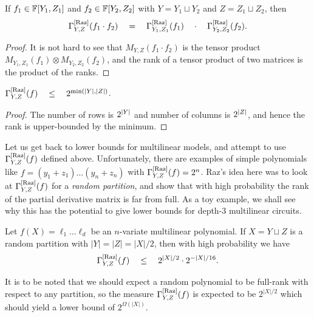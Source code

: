\begin{observation}[Multiplicativity]\label{obs:pdm-multiplicativity}
If $f_1 \in \mathbb{F}[Y_1,Z_1]$ and $f_2 \in \mathbb{F}[Y_2, Z_2]$ with $Y = Y_1 \sqcup Y_2$ and $Z = Z_1 \sqcup Z_2$, then
$$
\Gamma^{\mathrm{[Raz]}}_{Y,Z}(f_1\cdot f_2) \quad = \quad \Gamma^{\mathrm{[Raz]}}_{Y_1, Z_1}(f_1) \quad \cdot \quad \Gamma^{\mathrm{[Raz]}}_{Y_2, Z_2}(f_2).
$$
\end{observation}
\begin{proof}
  It is not hard to see that $M_{Y,Z}(f_1\cdot f_2)$ is the tensor product $M_{Y_1, Z_1}(f_1) \otimes M_{Y_2, Z_2}(f_2)$, and the rank of a tensor product of two matrices is the product of the ranks.
\end{proof}

\begin{observation}\label{obs:pdm-upperbound}
  $\Gamma^{\mathrm{[Raz]}}_{Y,Z}(f) \quad \leq \quad 2^{\min(\left|Y\right|, \left|Z\right|)}$.
\end{observation}
\begin{proof}
  The number of rows is $2^{\left|Y\right|}$ and number of columns is $2^{\left|Z\right|}$, and hence the rank is upper-bounded by the minimum.
\end{proof}


Let us get back to lower bounds for multilinear models, and attempt to use $\Gamma^{\mathrm{[Raz]}}_{Y,Z}(f)$ defined above. Unfortunately, there are examples of simple polynomials like $f = (y_1 + z_1)\dots (y_n + z_n)$ with $\Gamma^{\mathrm{[Raz]}}_{Y,Z}(f) = 2^n$. Raz's idea here was to look at $\Gamma^{\mathrm{[Raz]}}_{Y,Z}(f)$ for a \emph{random partition}, and show that with high probability the rank of the partial derivative matrix is far from full. As a toy example, we shall see why this has the potential to give lower bounds for depth-$3$ multilinear circuits. 

\begin{lemma}
Let $f(X) = \ell_1 \dots \ell_d$ be an $n$-variate multilinear polynomial. If $X = Y\sqcup Z$ is a random partition with $|Y| = |Z| = |X|/2$, then with high probability we have
$$
\Gamma^{\mathrm{[Raz]}}_{Y,Z}(f) \quad \leq \quad 2^{|X|/2} \cdot 2^{-|X|/16}.
$$
\end{lemma}

It is to be noted that we should expect a random polynomial to be full-rank with respect to any partition, so the measure $\Gamma^{\mathrm{[Raz]}}_{Y,Z}(f)$ is expected to be $2^{|X|/2}$ which should yield a lower bound of $2^{\Omega(|X|)}$. 

